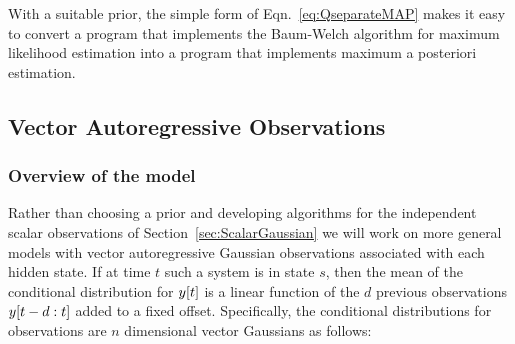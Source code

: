 With a suitable prior, the simple form of Eqn.~\eqref{eq:QseparateMAP}
makes it easy to convert a program that implements the Baum-Welch
algorithm for  maximum likelihood
estimation into a program that implements maximum a posteriori
estimation.

\subsection{Vector Autoregressive Observations}
\label{sec:ARVGaussian}

\subsubsection{Overview of the model}

Rather than choosing a prior and developing algorithms for the
independent scalar observations of Section~\ref{sec:ScalarGaussian} we will
work on more general models with vector autoregressive Gaussian
observations associated with each hidden state.  If at time $t$ such a
system is in state $s$, then the mean of the conditional distribution
for ${y}{[t]}$ is a linear function of the $d$ previous observations
$y[t-d:t]$ added to a fixed offset.  Specifically, the
conditional distributions for observations are $n$ dimensional vector
Gaussians as follows:
